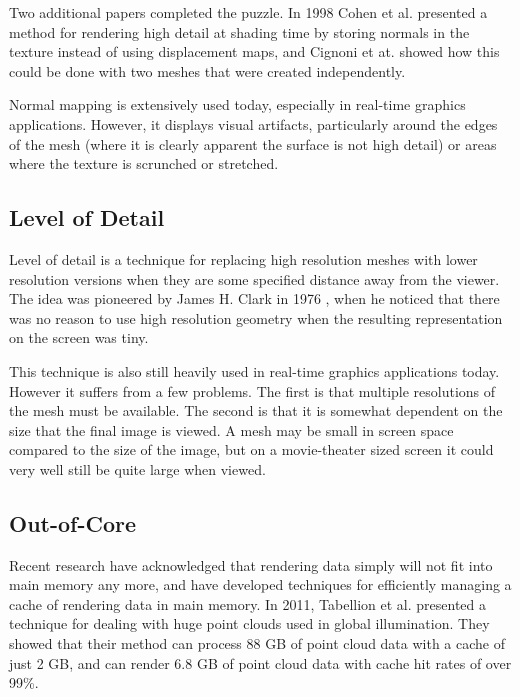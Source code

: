 \documentclass[12pt]{ucthesis}
\begin{document}
Two additional papers completed the puzzle. In 1998 Cohen et al. \cite{cohen:1998}
presented a method for rendering high detail at shading time by storing normals
in the texture instead of using displacement maps, and Cignoni et at. \cite{cignoni:1998}
showed how this could be done with two meshes that were created independently.

Normal mapping is extensively used today, especially in real-time graphics
applications. However, it displays visual artifacts, particularly around the
edges of the mesh (where it is clearly apparent the surface is not high detail)
or areas where the texture is scrunched or stretched.

\subsection{Level of Detail}
\label{levelofdetail}

Level of detail is a technique for replacing high resolution meshes with lower
resolution versions when they are some specified distance away from the viewer.
The idea was pioneered by James H. Clark in 1976 \cite{clark:1976}, when he
noticed that there was no reason to use high resolution geometry when the
resulting representation on the screen was tiny.

This technique is also still heavily used in real-time graphics applications
today. However it suffers from a few problems. The first is that multiple
resolutions of the mesh must be available. The second is that it is somewhat
dependent on the size that the final image is viewed. A mesh may be small in
screen space compared to the size of the image, but on a movie-theater sized
screen it could very well still be quite large when viewed.

\subsection{Out-of-Core}
\label{outofcore}

Recent research have acknowledged that rendering data simply will not fit into
main memory any more, and have developed techniques for efficiently managing
a cache of rendering data in main memory. In 2011, Tabellion et al. \cite{tabellion:2011}
presented a technique for dealing with huge point clouds used in global
illumination. They showed that their method can process 88 GB of point cloud
data with a cache of just 2 GB, and can render 6.8 GB of point cloud data with
cache hit rates of over 99\%.
\end{document}
